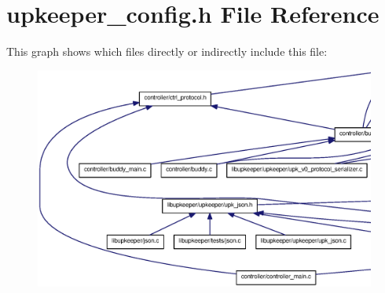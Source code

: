 \section{upkeeper\_\-config.h File Reference}
\label{upkeeper__config_8h}
This graph shows which files directly or indirectly include this file:
\nopagebreak
\begin{figure}[H]
\begin{center}
\leavevmode
\includegraphics[width=400pt]{upkeeper__config_8h__dep__incl}
\end{center}
\end{figure}
